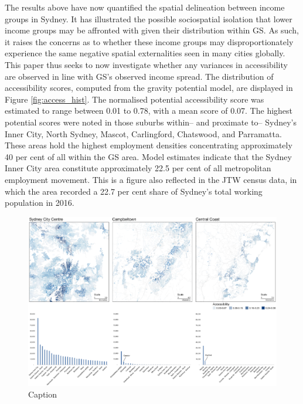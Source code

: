 The results above have now quantified the spatial delineation between income groups in Sydney. It has illustrated the possible sociospatial isolation that lower income groups may be affronted with given their distribution within GS. As such, it raises the concerns as to whether these income groups may disproportionately experience the same negative spatial externalities seen in many cities globally. This paper thus seeks to now investigate whether any variances in accessibility are observed in line with  GS's observed income spread. The distribution of accessibility scores, computed from the gravity potential model, are displayed in Figure \ref{fig:access_hist}. The normalised potential accessibility score was estimated to range between 0.01 to 0.78, with a mean score of 0.07. The highest potential scores were noted in those suburbs within-- and proximate to-- Sydney's Inner City, North Sydney, Mascot, Carlingford, Chatswood, and Parramatta. These areas hold the highest employment densities concentrating approximately 40 per cent of all within the GS area. Model estimates indicate that the Sydney Inner City area constitute approximately 22.5 per cent of all metropolitan employment movement. This is a figure also reflected in the JTW census data, in which the area recorded a 22.7 per cent share of Sydney's total working population in 2016. \\

\begin{figure}[!ht]
    \centering
    \includegraphics[width=1\textwidth]{body/figures/access_flows.png}
    \caption{Caption}
    \label{fig:access-flows}
\end{figure}

